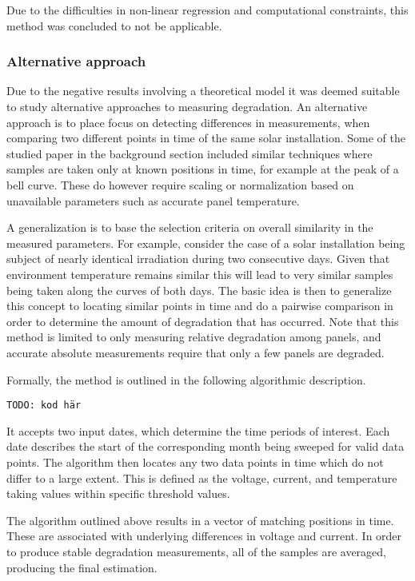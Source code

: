Due to the difficulties in non-linear regression and computational constraints, this method was concluded to not be applicable.

\subsubsection{Alternative approach}
Due to the negative results involving a theoretical model it was deemed suitable to study alternative approaches to measuring degradation.
An alternative approach is to place focus on detecting differences in measurements, when comparing two different points in time of the same solar installation.
Some of the studied paper in the background section included similar techniques where samples are taken only at known positions in time, for example at the peak of a bell curve.
These do however require scaling or normalization based on unavailable parameters such as accurate panel temperature.

A generalization is to base the selection criteria on overall similarity in the measured parameters.
For example, consider the case of a solar installation being subject of nearly identical irradiation during two consecutive days.
Given that environment temperature remains similar this will lead to very similar samples being taken along the curves of both days.
The basic idea is then to generalize this concept to locating similar points in time and do a pairwise comparison in order to determine the amount of degradation that has occurred.
Note that this method is limited to only measuring relative degradation among panels, and accurate absolute measurements require that only a few panels are degraded.

Formally, the method is outlined in the following algorithmic description.

\begin{verbatim}
TODO: kod här
\end{verbatim}

It accepts two input dates, which determine the time periods of interest.
Each date describes the start of the corresponding month being sweeped for valid data points.
The algorithm then locates any two data points in time which do not differ to a large extent.
This is defined as the voltage, current, and temperature taking values within specific threshold values.

The algorithm outlined above results in a vector of matching positions in time.
These are associated with underlying differences in voltage and current.
In order to produce stable degradation measurements, all of the samples are averaged, producing the final estimation.

